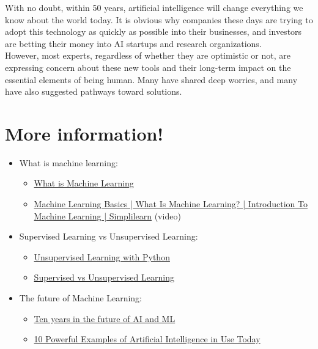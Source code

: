 \documentclass{42-en}
\begin{document}
With no doubt, within 50 years, artificial intelligence will change everything we know about the world today. It is obvious why companies these days are trying to adopt this technology as quickly as possible into their businesses, and investors are betting their money into AI startups and research organizations.\\

However, most experts, regardless of whether they are optimistic or not, are expressing concern about these new tools and their long-term impact on the essential elements of being human. Many have shared deep worries, and many have also suggested pathways toward solutions.\\

\section*{More information!}

\begin{itemize}
    \item What is machine learning:
    \begin{itemize}
        \item \href{https://towardsdatascience.com/what-is-machine-learning-8c6871016736}{What is Machine Learning}
        \item \href{https://www.youtube.com/watch?v=ukzFI9rgwfU}{Machine Learning Basics | What Is Machine Learning? | Introduction To Machine
Learning | Simplilearn} (video)
    \end{itemize}
    \item Supervised Learning vs Unsupervised Learning:
\begin{itemize}    
        \item \href{https://towardsdatascience.com/unsupervised-learning-with-python-173c51dc7f03}{Unsupervised Learning with Python}
        \item \href{https://towardsdatascience.com/supervised-vs-unsupervised-learning-14f68e32ea8d}{Supervised vs Unsupervised Learning}
    \end{itemize}
    \item The future of Machine Learning:
    \begin{itemize}
        \item \href{https://medium.com/foursquare-direct/in-ten-years-the-future-of-ai-and-ml-fa68a527f378}{Ten years in the future of AI and ML}
        \item \href{https://www.forbes.com/sites/robertadams/2017/01/10/10-powerful-examples-of-artificial-intelligence-in-use-today/}{10 Powerful Examples of Artificial Intelligence in Use Today}
    \end{itemize}
\end{itemize}
\end{document}
